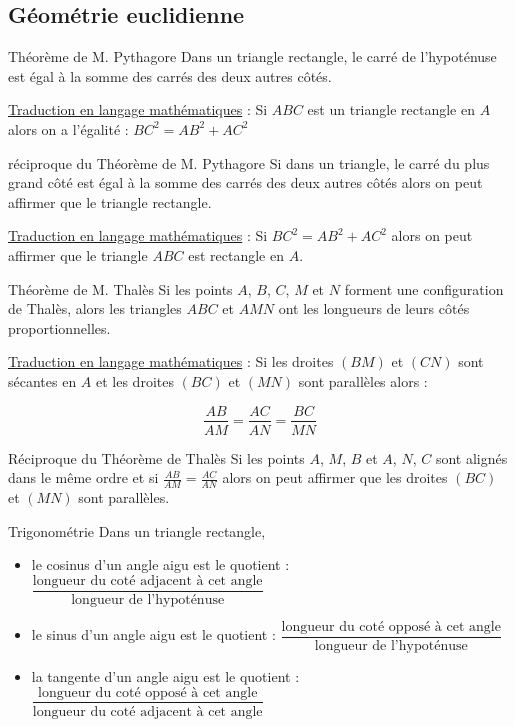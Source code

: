 \begin{pageCours} %


\section{Géométrie euclidienne}

\begin{ThT}{Théorème de M. Pythagore}
Dans un triangle rectangle, le carré de l'hypoténuse est égal à la somme des carrés des deux autres côtés.

\underline{Traduction en langage mathématiques} : Si $ABC$ est un triangle rectangle en $A$ alors on a l'égalité : $BC^2=AB^2+AC^2$
\end{ThT}

\begin{ThT}{réciproque du Théorème de M. Pythagore}
Si dans un triangle, le carré du plus grand côté est égal à la somme des carrés des deux autres côtés alors on peut affirmer que le triangle rectangle.

\underline{Traduction en langage mathématiques} : Si $BC^2=AB^2+AC^2$ alors on peut affirmer que le triangle $ABC$ est rectangle en $A$.
\end{ThT}

\begin{ThT}{Théorème de M. Thalès}
Si les points $A$, $B$, $C$, $M$ et $N$ forment une configuration de Thalès, alors les triangles $ABC$ et $AMN$ ont les longueurs de leurs côtés proportionnelles.

\underline{Traduction en langage mathématiques} : Si les droites $(BM)$ et $(CN)$ sont sécantes en $A$ et les droites $(BC)$ et $(MN)$ sont parallèles alors :

\[\frac{AB}{AM}=\frac{AC}{AN}=\frac{BC}{MN}\]
\end{ThT}

\begin{ThT}{Réciproque du Théorème de Thalès}
Si les points  $A$, $M$, $B$ et $A$, $N$, $C$ sont alignés dans le même ordre et si $\frac{AB}{AM}=\frac{AC}{AN}$ alors on peut affirmer que les droites $(BC)$ et $(MN)$ sont parallèles. 
\end{ThT}

\begin{DefT}{Trigonométrie}
Dans un triangle rectangle,
\begin{itemize}
\item le cosinus d'un angle aigu est le quotient :
$\dfrac{\text{longueur du coté adjacent à cet angle}}{\text{longueur de l'hypoténuse}}$
\item le sinus d'un angle aigu est le quotient : 
$\dfrac{\text{longueur du coté opposé à cet angle}}{\text{longueur de l'hypoténuse}}$
\item la tangente d'un angle aigu est le quotient : 
$\dfrac{\text{longueur du coté opposé à cet angle}}{\text{longueur du coté adjacent à cet angle}}$
\end{itemize}
\end{DefT}

\end{pageCours} %

